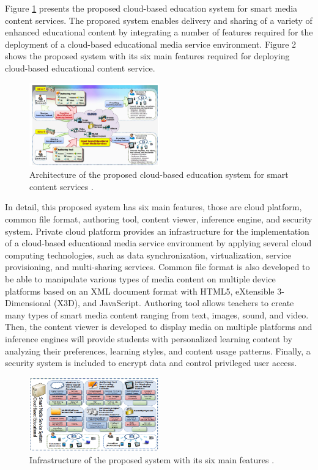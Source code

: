 \documentclass[journal]{vgtc}
\begin{document}
  Figure \ref{archi} presents the proposed cloud-based education system for smart media content services. The proposed system enables delivery and sharing of a variety of enhanced educational content by integrating a number of features required for the deployment of a cloud-based educational media service environment. Figure 2 shows the proposed system with its six main features required for deploying cloud-based educational content service.

  \begin{figure}[t]
    \centering
    \includegraphics[width=0.5\textwidth]{content-oriented-archi}
    \caption{Architecture of the proposed cloud-based education system for smart content services \cite{jeong2013content}.}
    \label{archi}
  \end{figure}

  In detail, this proposed system has six main features, those are cloud platform, common file format, authoring tool, content viewer, inference engine, and security system. Private cloud platform provides an infrastructure for the implementation of a cloud-based educational media service environment by applying several cloud computing technologies, such as data synchronization, virtualization, service provisioning, and multi-sharing services. Common file format is also developed to be able to manipulate various types of media content on multiple device platforms based on an XML document format with HTML5, eXtensible 3-Dimensional (X3D), and JavaScript. Authoring tool allows teachers to create many types of smart media content ranging from text, images, sound, and video. Then, the content viewer is developed to display media on multiple platforms and inference engines will provide students with personalized learning content by analyzing their preferences, learning styles, and content usage patterns. Finally, a security system is included to encrypt data and control privileged user access.

  \begin{figure}[!b]
    \centering
    \includegraphics[width=0.5\textwidth]{content-oriented-feature}
    \caption{Infrastructure of the proposed system with its six main features \cite{jeong2013content}.}
    \label{feature}
  \end{figure}
\end{document}
